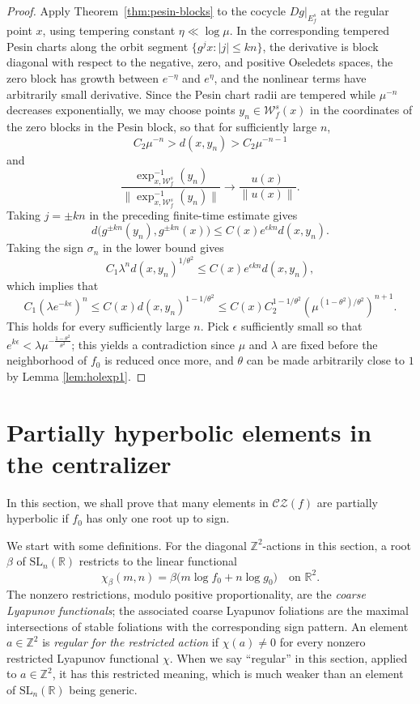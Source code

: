 \documentclass[11pt]{amsart}
\numberwithin{equation}{section}
\newcommand{\CZ}{\mathcal{CZ}}
\newcommand{\SL}{\mathrm{SL}}
\theoremstyle{plain}
\begin{document}
\begin{proof}
Apply Theorem~\ref{thm:pesin-blocks} to the cocycle $Dg|_{E^s_f}$ at the regular point $x$, using tempering constant $\eta\ll \log \mu$. In the corresponding tempered Pesin charts along the orbit segment $\{g^jx:|j|\le kn\}$, the derivative is block diagonal with respect to the negative, zero, and positive Oseledets spaces, the zero block has growth between $e^{-\eta}$ and $e^\eta$, and the nonlinear terms have arbitrarily small derivative. Since the Pesin chart radii are tempered while $\mu^{-n}$ decreases exponentially, we may choose points $y_n\in\mathcal W_f^s(x)$ in the coordinates of the zero blocks in the Pesin block, so that for sufficiently large $n$, \[ C_2\mu^{-n}>d(x,y_n)>C_2\mu^{-n-1} \]  and \[ \frac{\exp_{x,\mathcal W_f^s}^{-1}(y_n)} {\|\exp_{x,\mathcal W_f^s}^{-1}(y_n)\|} \longrightarrow \frac{u(x)}{\|u(x)\|}. \] Taking $j=\pm kn$ in the preceding finite-time estimate gives  \[ d\bigl(g^{\pm kn}(y_n),g^{\pm kn}(x)\bigr) \le C(x)e^{\epsilon kn}d(x,y_n). \]
Taking the sign
$\sigma_n$ in the lower bound gives
 \[
C_1\lambda^n d(x,y_n)^{1/\theta^2}
\le C(x)e^{\epsilon kn}d(x,y_n),
\]
which implies that
 \[
C_1(\lambda e^{-k\epsilon})^{n}\le C(x)d(x,y_n)^{1-1/\theta^2}
\le C(x)C_2^{1-1/\theta^2}
(\mu^{(1-\theta^2)/\theta^2})^{n+1}.
\]
This holds for every  sufficiently large $n$.  Pick $\epsilon$ sufficiently small so that $e^{k\epsilon}<\lambda \mu^{-\frac{1-\theta^2}{\theta^2}}$; this yields a contradiction since $\mu$ and $\lambda$ are fixed before the neighborhood of $f_0$ is reduced once more, and $\theta$ can be made arbitrarily close to $1$  by Lemma \ref{lem:holexp1}.
\end{proof}


\section{Partially hyperbolic elements in the centralizer}\label{sec:gph}
In this section, we shall prove that many elements in $\CZ(f)$ are partially hyperbolic if $f_0$ has only one root up to sign.

We start with some definitions.
For the diagonal $\mathbb Z^2$-actions in this section, a root $\beta$ of
$\SL_n(\mathbb R)$ restricts to the linear functional
\[
 \chi_\beta(m,n)=\beta\bigl(m\log f_0+n\log g_0\bigr)
 \quad\text{on }\mathbb R^2.
\]
The nonzero restrictions, modulo positive proportionality, are the
\emph{coarse Lyapunov functionals}; the associated coarse Lyapunov
foliations are the maximal intersections of stable foliations with the
corresponding sign pattern.  An element $a\in\mathbb Z^2$ is
\emph{regular for the restricted action} if $\chi(a)\ne0$ for every
nonzero restricted Lyapunov functional $\chi$.  When we say ``regular'' in this section, applied
to $a\in\mathbb Z^2$, it has this restricted meaning, which is much weaker than an element of $\SL_n(\mathbb R)$ being generic.  
\end{document}
